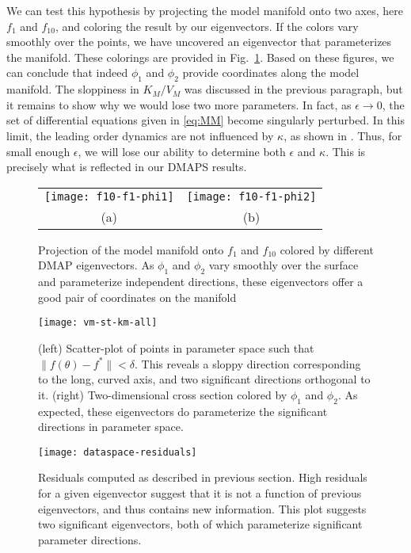 We can test this hypothesis by projecting the model manifold onto two
axes, here $f_1$ and $f_{10}$, and coloring the result by our
eigenvectors. If the colors vary smoothly over the points, we have
uncovered an eigenvector that parameterizes the manifold. These
colorings are provided in Fig.~\ref{fig:mm-dmaps}. Based on these
figures, we can conclude that indeed $\phi_1$ and $\phi_2$ provide
coordinates along the model manifold. The sloppiness in $K_M/V_M$ was
discussed in the previous paragraph, but it remains to show why we
would lose two more parameters. In fact, as $\epsilon \rightarrow 0$,
the set of differential equations given in \eqref{eq:MM} become
singularly perturbed. In this limit, the leading order dynamics are
not influenced by $\kappa$, as shown in
\cite{segel_quasi-steady-state_1989}. Thus, for small enough
$\epsilon$, we will lose our ability to determine both $\epsilon$ and
$\kappa$. This is precisely what is reflected in our DMAPS results.

\begin{figure}[!htp]
  \centering
  \begin{tabular}{cc}
    \texttt{[image: f10-f1-phi1]} &
    \texttt{[image: f10-f1-phi2]}\\
    (a) & (b) \\
  \end{tabular}
  \caption[DMAPS results for Michaelis-Menten system I]{Projection of the model manifold onto $f_1$ and $f_{10}$
    colored by different DMAP eigenvectors. As $\phi_1$ and $\phi_2$
    vary smoothly over the surface and parameterize independent
    directions, these eigenvectors offer a good pair of coordinates on
    the manifold \label{fig:mm-dmaps}}
\end{figure}


\begin{figure}[ht!]
  \centering
  \texttt{[image: vm-st-km-all]}
  \caption[DMAPS results for Michaelis-Menten system II]{(left) Scatter-plot of points in parameter space such that
    $\|f(\theta) - f^*\| < \delta$. This reveals a sloppy direction
    corresponding to the long, curved axis, and two significant
    directions orthogonal to it. (right) Two-dimensional cross section
    colored by $\phi_1$ and $\phi_2$. As expected, these eigenvectors
    do parameterize the significant directions in parameter space.
    \label{fig:mm-all} }
\end{figure}

\begin{figure}
  \centering
  \texttt{[image: dataspace-residuals]}
  \caption[DMAPS residuals from Michaelis-Menten system]{Residuals
    computed as described in previous section. High residuals for a
    given eigenvector suggest that it is not a function of previous
    eigenvectors, and thus contains new information. This plot
    suggests two significant eigenvectors, both of which parameterize
    significant parameter directions. \label{fig:resids} }
\end{figure}

